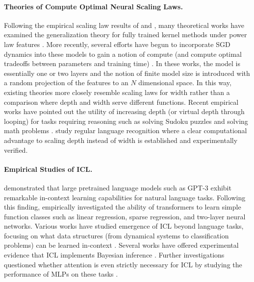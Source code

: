 \documentclass{article} %
\begin{document}
\paragraph{Theories of Compute Optimal Neural Scaling Laws.} Following the empirical scaling law results of \cite{kaplan2020scaling} and \cite{hoffmann2022training}, many theoretical works have examined the generalization theory for fully trained kernel methods under power law features  \citep{bordelon2020spectrum, spigler2020asymptotic, cui2021generalization, bahri2021explaining, maloney2022solvable, atanasov2023onset, atanasov2022neural,defilippis2024dimension}. More recently, several efforts have begun to incorporate SGD dynamics into these models to gain a notion of compute (and compute optimal tradeoffs between parameters and training time) \citep{bordelon2022learning, bordelon2024dynamical, paquette20244+, lin2024scaling, kunstner2025scaling, bordelon2025feature}. In these works, the model is essentially one or two layers and the notion of finite model size is introduced with a random projection of the features to an $N$ dimensional space. In this way, existing theories more closely resemble scaling laws for width rather than a comparison where depth and width serve different functions. Recent empirical works have pointed out the utility of increasing depth (or virtual depth through looping) for tasks requiring reasoning such as solving Sudoku puzzles \citep{wang2025hierarchical} and solving math problems \citep{zhu20254th,geiping2025scaling}. \cite{merrill2025little} study regular language recognition where a clear computational advantage to scaling depth instead of width is established and experimentally verified. 

\vspace{-10pt}
\paragraph{Empirical Studies of ICL.} \cite{brown2020language} demonstrated that large pretrained language models such as GPT-3 exhibit remarkable in-context learning capabilities for natural language tasks. Following this finding, \cite{garg2022can} empirically investigated the ability of transformers to learn simple function classes such as linear regression, sparse regression, and two-layer neural networks. Various works have studied emergence of ICL beyond language tasks, focusing on what data structures (from dynamical systems to classification problems) can be learned in-context \citep{liu2024llms,chan2022datadistributionalpropertiesdrive,iclmodular_learningtogrok,mccracken2025uncoveringuniversalabstractalgorithm, park2024iclr, chen2024training}. Several works have offered experimental evidence that ICL implements Bayesian inference \citep{xie2021explanation, wurgaft2025context, liu2024betterunderstandingincontextlearning,panwar2024incontextlearningbayesianprism, zhang2023and}. Further investigations questioned whether attention is even strictly necessary for ICL by studying the performance of MLPs on these tasks \citep{tong2025mlpslearnincontextregression, kratsios2025incontextuniversalityenoughmlps}.
\vspace{-10pt}
\end{document}
